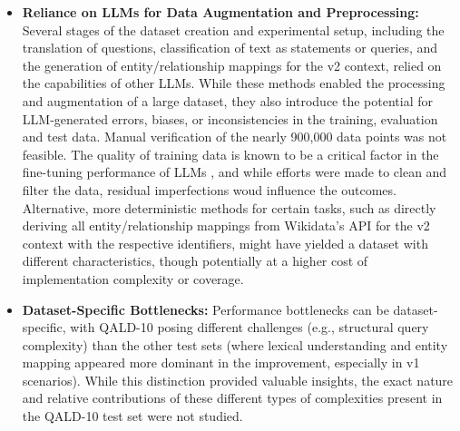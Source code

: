 \begin{itemize}
    \item \textbf{Reliance on LLMs for Data Augmentation and Preprocessing:} Several stages of the dataset creation and experimental setup, including the translation of questions, classification of text as statements or queries, and the generation of entity/relationship mappings for the v2 context, relied on the capabilities of other LLMs.
    While these methods enabled the processing and augmentation of a large dataset, they also introduce the potential for LLM-generated errors, biases, or inconsistencies in the training, evaluation and test data. 
    Manual verification of the nearly 900,000 data points was not feasible. 
    The quality of training data is known to be a critical factor in the fine-tuning performance of LLMs \cite{dettmers2023qlora}, and while efforts were made to clean and filter the data, residual imperfections woud influence the outcomes. 
    Alternative, more deterministic methods for certain tasks, such as directly deriving all entity/relationship mappings from Wikidata's API for the v2 context with the respective identifiers, might have yielded a dataset with different characteristics, though potentially at a higher cost of implementation complexity or coverage.

    \item \textbf{Dataset-Specific Bottlenecks:} Performance bottlenecks can be dataset-specific, with QALD-10 posing different challenges (e.g., structural query complexity) than the other test sets (where lexical understanding and entity mapping appeared more dominant in the improvement, especially in v1 scenarios). 
    While this distinction provided valuable insights, the exact nature and relative contributions of these different types of complexities present in the QALD-10 test set were not studied.

\end{itemize}